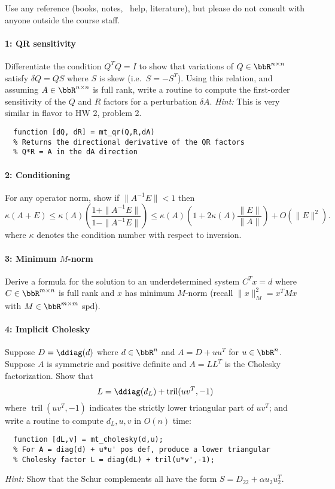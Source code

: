 \documentclass[12pt, leqno]{article} %
\newcommand{\tril}{\operatorname{tril}}
\begin{document}

Use any reference (books, notes, \matlab\ help, literature),
but please do not consult with anyone outside the course staff.

\paragraph*{1: QR sensitivity}
Differentiate the condition $Q^T Q = I$ to show that variations
of $Q \in \bbR^{n \times n}$ satisfy $\delta Q = Q S$ where $S$ is skew (i.e.~$S= -S^T$).
Using this relation, and assuming $A \in \bbR^{n \times n}$ is full rank,
write a routine to compute the first-order
sensitivity of the $Q$ and $R$ factors for a perturbation $\delta A$.
{\em Hint:} This is very similar in flavor to HW 2, problem 2.
\begin{lstlisting}
  function [dQ, dR] = mt_qr(Q,R,dA)
  % Returns the directional derivative of the QR factors
  % Q*R = A in the dA direction
\end{lstlisting}

\paragraph*{2: Conditioning}
For any operator norm, show if $\|A^{-1} E\| < 1$ then
\[
  \kappa(A+E) \leq
  \kappa(A) \left( \frac{1+\|A^{-1}E\|}{1-\|A^{-1}E\|} \right) \leq
  \kappa(A) \left( 1 + 2 \kappa(A) \frac{\|E\|}{\|A\|} \right) + O(\|E\|^2).
\]
where $\kappa$ denotes the condition number with respect to inversion.

\paragraph*{3: Minimum $M$-norm}
Derive a formula for the solution to an underdetermined system
$C^T x = d$ where $C \in \bbR^{m \times n}$ is full rank and
$x$ has minimum $M$-norm
(recall $\|x\|_M^2 = x^T M x$ with $M \in \bbR^{m \times m}$ spd).

\paragraph*{4: Implicit Cholesky}
Suppose $D = \ddiag(d)$ where $d \in \bbR^n$
and $A = D + uu^T$ for $u \in \bbR^n$.  Suppose $A$ is symmetric
and positive definite and $A = L L^T$ is the Cholesky factorization.
Show that
\[
  L = \ddiag(d_L) + \tril(uv^T,-1)
\]
where $\tril(uv^T,-1)$ indicates the strictly lower triangular
part of $uv^T$; and write a routine to compute $d_L, u, v$ in $O(n)$
time:
\begin{lstlisting}
  function [dL,v] = mt_cholesky(d,u);
  % For A = diag(d) + u*u' pos def, produce a lower triangular
  % Cholesky factor L = diag(dL) + tril(u*v',-1);
\end{lstlisting}
{\em Hint:} Show that the Schur complements all have the form
$S = D_{22} + \alpha u_2 u_2^T$.
\end{document}
